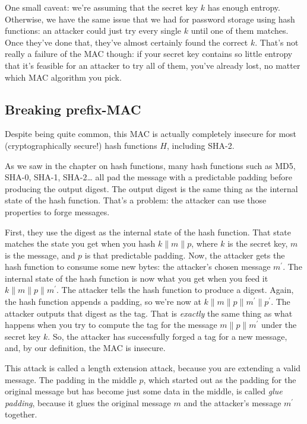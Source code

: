 \documentclass[11pt,ebook,table,dvipsnames]{memoir}
\begin{document}
One small caveat: we're assuming that the secret key $k$ has enough
entropy. Otherwise, we have the same issue that we had for password
storage using hash functions: an attacker could just try every single
$k$ until one of them matches. Once they've done that, they've almost
certainly found the correct $k$. That's not really a failure of the
MAC though: if your secret key contains so little entropy that it's
feasible for an attacker to try all of them, you've already lost, no
matter which MAC algorithm you pick.

\subsection{Breaking prefix-MAC}
\label{sec-2-7-3-1}

Despite being quite common, this MAC is actually completely insecure
for most (cryptographically secure!) hash functions $H$, including
SHA-2.

As we saw in the chapter on hash functions, many hash functions such
as MD5, SHA-0, SHA-1, SHA-2\ldots{} all pad the message with a predictable
padding before producing the output digest. The output digest is the
same thing as the internal state of the hash function. That's a
problem: the attacker can use those properties to forge messages.

First, they use the digest as the internal state of the hash function.
That state matches the state you get when you hash $k \| m \| p$,
where $k$ is the secret key, $m$ is the message, and $p$ is that
predictable padding. Now, the attacker gets the hash function to
consume some new bytes: the attacker's chosen message $m^{\prime}$.
The internal state of the hash function is now what you get when you
feed it $k \| m \| p \| m^{\prime}$. The attacker tells the hash
function to produce a digest. Again, the hash function appends a
padding, so we're now at $k \| m \| p \| m^{\prime} \| p^{\prime}$.
The attacker outputs that digest as the tag. That is \emph{exactly} the
same thing as what happens when you try to compute the tag for the
message $m \| p \| m^{\prime}$ under the secret key $k$. So, the
attacker has successfully forged a tag for a new message, and, by our
definition, the MAC is insecure.

This attack is called a length extension attack, because you are
extending a valid message. The padding in the middle $p$, which
started out as the padding for the original message but has become
just some data in the middle, is called \emph{glue padding}, because it
glues the original message $m$ and the attacker's message $m^{\prime}$
together.
\end{document}
